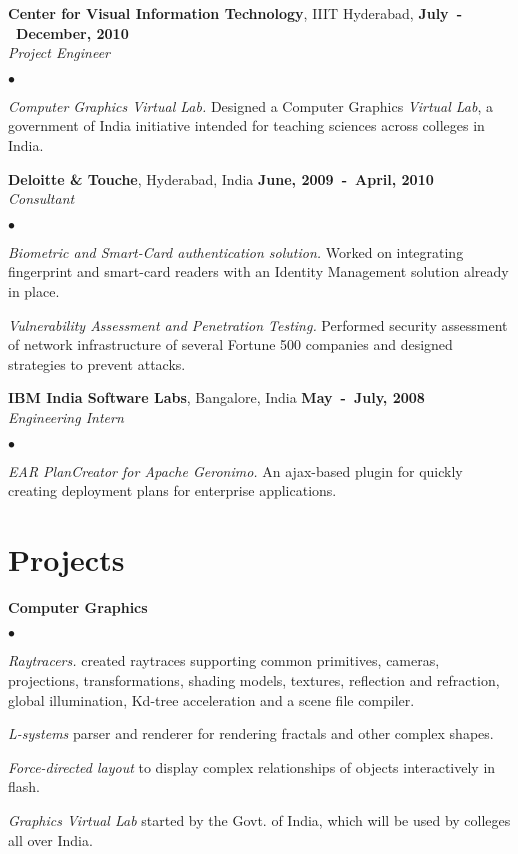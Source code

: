 \documentclass[margin,line]{res}
\newenvironment{list2}{
  \begin{list}{$\bullet$}{%
      \setlength{\itemsep}{0in}
      \setlength{\parsep}{0in} \setlength{\parskip}{0in}
      \setlength{\topsep}{0in} \setlength{\partopsep}{0in} 
      \setlength{\leftmargin}{0.2in}}}{\end{list}}
\begin{document}
\begin{resume}
{\bf Center for Visual Information Technology}, IIIT Hyderabad, \hfill {\bf July~-~December, 2010}\\
{\em Project Engineer}\par
\begin{list2}
\item {\em Computer Graphics Virtual Lab.} Designed a Computer Graphics {\em Virtual Lab}, a government of India initiative intended for teaching sciences across colleges in India.
\end{list2}

{\bf Deloitte \& Touche}, Hyderabad, India \hfill {\bf June, 2009~-~April, 2010}\\
{\em Consultant}\par
\begin{list2}
\item {\em Biometric and Smart-Card authentication solution.} Worked on integrating fingerprint
and smart-card readers with an Identity Management solution already in place.
\item {\em Vulnerability Assessment and Penetration Testing.} Performed security assessment
of network infrastructure of several Fortune 500 companies and designed strategies to prevent attacks.
\end{list2}

{\bf IBM India Software Labs}, Bangalore, India \hfill {\bf May~-~July, 2008}\\
{\em Engineering Intern}\par
\begin{list2}
\item {\em EAR PlanCreator for Apache Geronimo.} An ajax-based plugin for quickly creating deployment plans for enterprise applications.
\end{list2}

\section{\sc Projects}
{\bf Computer Graphics}
\begin{list2}
\item {\em Raytracers.} created raytraces supporting common primitives, cameras, projections, transformations,
shading models, textures, reflection and refraction, global illumination, Kd-tree acceleration and a scene file compiler.
\item {\em L-systems} parser and renderer for rendering fractals and other complex shapes.
\item {\em Force-directed layout} to display complex relationships of objects interactively in flash.
\item {\em Graphics Virtual Lab} started by the Govt. of India, which will be used by colleges all over India.
\end{list2}


\end{resume}
\end{document}
